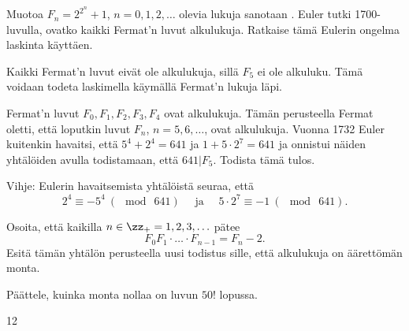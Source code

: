 \begin{tehtavasivu}
\begin{tehtava}
    Muotoa $F_n = 2^{2^n}+1$, $n=0, 1, 2, \ldots$ olevia lukuja sanotaan . Euler tutki 1700-luvulla, ovatko kaikki Fermat'n luvut alkulukuja. Ratkaise tämä Eulerin ongelma laskinta käyttäen.
    
    \begin{vastaus}
        Kaikki Fermat'n luvut eivät ole alkulukuja, sillä $F_5$ ei ole alkuluku. Tämä voidaan todeta laskimella käymällä Fermat'n lukuja läpi.
    \end{vastaus}
\end{tehtava}

\begin{tehtava}
    Fermat'n luvut $F_0, F_1, F_2, F_3, F_4$ ovat alkulukuja. Tämän perusteella Fermat oletti, että loputkin luvut $F_n$, $n=5, 6, \ldots$, ovat alkulukuja. Vuonna 1732 Euler kuitenkin havaitsi, että $5^4 + 2^4 = 641$
ja $1 + 5\cdot 2^7 = 641$ ja onnistui näiden yhtälöiden avulla todistamaan, että $641 | F_5$. Todista tämä tulos.

Vihje: Eulerin havaitsemista yhtälöistä seuraa, että
\[
2^4 \equiv -5^4\ (\mod\ 641)\quad\text{ ja }\quad5\cdot 2^7 \equiv -1\ (\mod\ 641).
\]
\end{tehtava}

\begin{tehtava}
    Osoita, että kaikilla $n\in\zz_{+}=1, 2, 3, \ldots$ pätee
\[
F_{0}F_{1}\cdot \ldots \cdot F_{n-1} = F_{n} - 2.
\]
Esitä tämän yhtälön perusteella uusi todistus sille,
että alkulukuja on äärettömän monta.
\end{tehtava}

\begin{tehtava}
    Päättele, kuinka monta nollaa on luvun $50!$ lopussa.

    \begin{vastaus}
        12
    \end{vastaus}
    
\end{tehtava}

\end{tehtavasivu}
